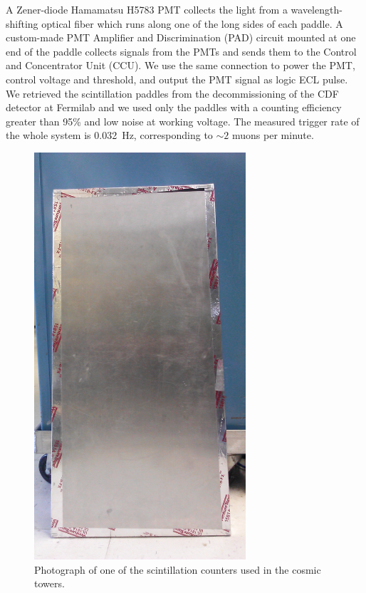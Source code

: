  A Zener-diode Hamamatsu H5783 PMT collects the light from a wavelength-shifting optical fiber which runs along one of the long sides of each paddle. A custom-made PMT Amplifier and Discrimination (PAD) circuit mounted at one end of the paddle collects signals from the PMTs and sends them to the Control and Concentrator Unit (CCU). We use the same connection to  power the PMT, control voltage and threshold, and output the PMT signal as logic ECL pulse.
We retrieved the scintillation paddles from the decommissioning of the CDF detector at Fermilab and we used only the paddles with a counting efficiency greater than 95\% and low noise at working voltage. The measured trigger rate of the whole system is 0.032~Hz, corresponding to $\sim 2$ muons per minute.


\begin{figure}[h!]
\centering
 \includegraphics[angle=90,width=0.7\textwidth]{Chapter-3/Images/Cosmic_Paddle.jpg}
\caption{Photograph of one of the scintillation counters used in the cosmic towers. } 
\label{pic:cosmicpaddle}
\end{figure}





